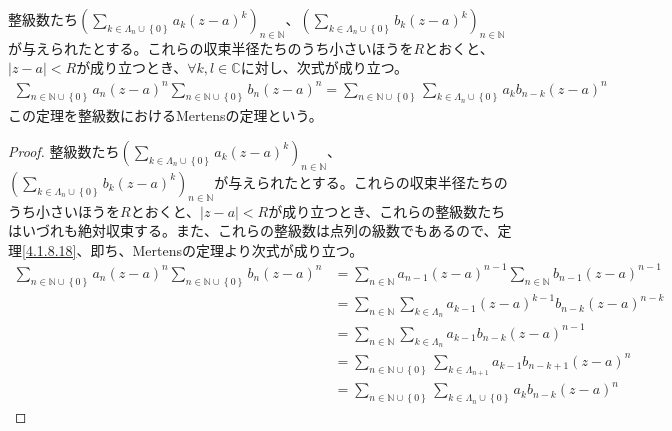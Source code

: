 \documentclass[dvipdfmx]{jsarticle}
\begin{document}
\begin{thm}[整級数におけるMertensの定理]\label{4.1.13.7}
整級数たち$\left( \sum_{k \in \varLambda_{n} \cup \left\{ 0 \right\}} {a_{k}(z - a)^{k}} \right)_{n \in \mathbb{N}}$、$\left( \sum_{k \in \varLambda_{n} \cup \left\{ 0 \right\}} {b_{k}(z - a)^{k}} \right)_{n \in \mathbb{N}}$が与えられたとする。これらの収束半径たちのうち小さいほうを$R$とおくと、$|z - a| < R$が成り立つとき、$\forall k,l \in \mathbb{C}$に対し、次式が成り立つ。
\begin{align*}
\sum_{n \in \mathbb{N} \cup \left\{ 0 \right\}} {a_{n}(z - a)^{n}}\sum_{n \in \mathbb{N} \cup \left\{ 0 \right\}} {b_{n}(z - a)^{n}} = \sum_{n \in \mathbb{N} \cup \left\{ 0 \right\}} {\sum_{k \in \varLambda_{n} \cup \left\{ 0 \right\}} {a_{k}b_{n - k}}(z - a)^{n}}
\end{align*}
この定理を整級数におけるMertensの定理という。
\end{thm}
\begin{proof}
整級数たち$\left( \sum_{k \in \varLambda_{n} \cup \left\{ 0 \right\}} {a_{k}(z - a)^{k}} \right)_{n \in \mathbb{N}}$、$\left( \sum_{k \in \varLambda_{n} \cup \left\{ 0 \right\}} {b_{k}(z - a)^{k}} \right)_{n \in \mathbb{N}}$が与えられたとする。これらの収束半径たちのうち小さいほうを$R$とおくと、$|z - a| < R$が成り立つとき、これらの整級数たちはいづれも絶対収束する。また、これらの整級数は点列の級数でもあるので、定理\ref{4.1.8.18}、即ち、Mertensの定理より次式が成り立つ。
\begin{align*}
\sum_{n \in \mathbb{N} \cup \left\{ 0 \right\}} {a_{n}(z - a)^{n}}\sum_{n \in \mathbb{N} \cup \left\{ 0 \right\}} {b_{n}(z - a)^{n}} &= \sum_{n \in \mathbb{N}} {a_{n - 1}(z - a)^{n - 1}}\sum_{n \in \mathbb{N}} {b_{n - 1}(z - a)^{n - 1}}\\
&= \sum_{n \in \mathbb{N}} {\sum_{k \in \varLambda_{n}} {a_{k - 1}(z - a)^{k - 1}b_{n - k}(z - a)^{n - k}}}\\
&= \sum_{n \in \mathbb{N}} {\sum_{k \in \varLambda_{n}} {a_{k - 1}b_{n - k}(z - a)^{n - 1}}}\\
&= \sum_{n \in \mathbb{N} \cup \left\{ 0 \right\}} {\sum_{k \in \varLambda_{n + 1}} {a_{k - 1}b_{n - k + 1}(z - a)^{n}}}\\
&= \sum_{n \in \mathbb{N} \cup \left\{ 0 \right\}} {\sum_{k \in \varLambda_{n} \cup \left\{ 0 \right\}} {a_{k}b_{n - k}(z - a)^{n}}}
\end{align*}
\end{proof}
\end{document}
